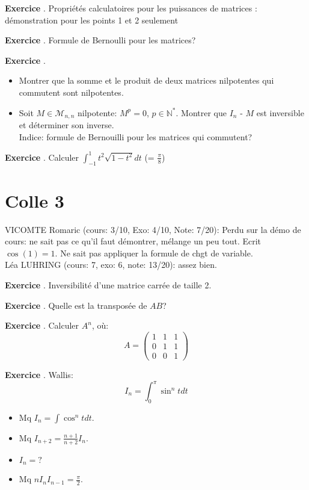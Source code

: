 \documentclass[10pt,a4paper]{article}
\newcounter{question}
\newcounter{exo}
\newenvironment{exo}{\vspace{0.5cm}\setcounter{question}{0}\addtocounter{exo}{1} \noindent \textbf{Exercice \theexo}. \normalsize }{\par}
\begin{document}
	\begin{exo}
		Propriétés calculatoires pour les puissances de matrices : démonstration pour les points 1 et 2 seulement
	\end{exo}

	\begin{exo}
		Formule de Bernoulli pour les matrices?
	\end{exo}

	\begin{exo}
		\begin{itemize}
			\item Montrer que la somme et le produit de deux matrices nilpotentes qui commutent sont nilpotentes.
			\item Soit $M \in \mathcal{M}_{n, n}$ nilpotente: $M^p = 0$, $p \in \mathbb{N}^*$. Montrer que $I_n$ - $M$ est inversible et déterminer son inverse. \\
			Indice: formule de Bernouilli pour les matrices qui commutent? 
		\end{itemize}
	\end{exo}
	
	\begin{exo}
		Calculer $\int_{-1}^{1} t^2 \sqrt{1 - t^2} dt$ (= $\frac{\pi}{8}$)
	\end{exo}
			
	\section*{Colle 3}
	\setcounter{exo}{0}
	VICOMTE Romaric (cours: 3/10, Exo: 4/10, Note: 7/20): Perdu sur la démo de cours: ne sait pas ce qu'il faut démontrer, mélange un peu tout. Ecrit $\cos(1) = 1$. Ne sait pas appliquer la formule de chgt de variable.\\
	Léa LUHRING (cours: 7, exo: 6, note: 13/20): assez bien.\\
	
	\begin{exo}
		Inversibilité d'une matrice carrée de taille 2.
	\end{exo}

	\begin{exo}
		Quelle est la transposée de $AB$?
	\end{exo}
	
	\begin{exo}
		Calculer $A^n$, où:
		$$A = \begin{pmatrix}
			1 & 1 & 1 \\ 
			0 & 1 & 1 \\ 
			0 & 0 & 1
		\end{pmatrix}$$
	\end{exo}
	
	\begin{exo}
		Wallis:
		$$I_n = \int_{0}^{\pi} \sin^n t dt$$
		\begin{itemize}
			\item Mq $I_n = \int \cos^n t dt$.
			\item Mq $I_{n+2} = \frac{n+1}{n+2} I_n$.
			\item $I_n = ?$
			\item Mq $n I_n I_{n-1} = \frac{\pi}{2}$.
		\end{itemize}
	\end{exo}
\end{document}

